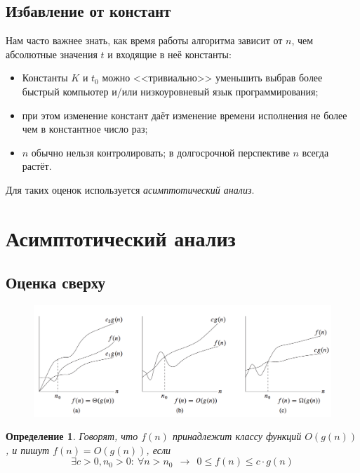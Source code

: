 \documentclass[12pt,a4paper]{report}
\newtheorem*{definition}{Определение}
\begin{document}
\subsection*{Избавление от констант}

Нам часто важнее знать, как время работы алгоритма зависит от $n$, чем абсолютные значения $t$ и входящие в неё константы: 
\begin{itemize}
\item Константы $K$ и $t_0$ можно <<тривиально>> уменьшить выбрав более быстрый компьютер и/или низкоуровневый язык программирования;
\item при этом изменение констант даёт изменение времени исполнения не более чем в константное число раз;
\item $n$ обычно нельзя контролировать; в долгосрочной перспективе $n$ всегда растёт. 
\end{itemize}

Для таких оценок используется {\em асимптотический анализ}.

\section{Асимптотический анализ}

\subsection*{Оценка сверху}


\begin{figure}[!ht]
\centering
\includegraphics[width=17cm]{classes.png}
\end{figure}

\begin{definition}
Говорят, что $f(n)$ принадлежит классу функций $O(g(n))$, и пишут $f(n)=O(g(n))$, если
$$
\exists c>0, n_0>0:~ \forall n > n_0 ~~\to~~ 0 \leqslant f(n) \leqslant c \cdot g(n)
$$

\end{definition}
\end{document}
